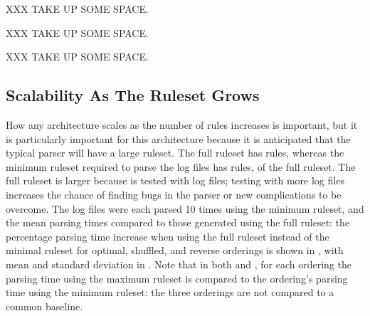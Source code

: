 XXX TAKE UP SOME SPACE\@.

XXX TAKE UP SOME SPACE\@.

XXX TAKE UP SOME SPACE\@.





\FloatBarrier{}

\subsection{Scalability As The Ruleset Grows}

\label{scalability as the number of rules rises}

How any architecture scales as the number of rules increases is important,
but it is particularly important for this architecture because it is
anticipated that the typical parser will have a large ruleset.  The full
\parsername{} ruleset has \numberOFrules{} rules, whereas the minimum
ruleset required to parse the \numberOFlogFILES{} log files has
\numberOFrulesMINIMUM{} rules, \numberOFrulesMINIMUMpercentage{} of the
full ruleset.  The full ruleset is larger because \parsername{} is tested
with \numberOFlogFILESall{} log files; testing with more log files
increases the chance of finding bugs in the parser or new complications to
be overcome.  The \numberOFlogFILES{} log files were each parsed 10 times
using the minimum ruleset, and the mean parsing times compared to those
generated using the full ruleset: the percentage parsing time increase when
using the full ruleset instead of the minimal ruleset for optimal,
shuffled, and reverse orderings is shown in , with mean and standard deviation in .  Note that in both  and
, for each ordering the parsing time
using the maximum ruleset is compared to the ordering's parsing time using
the minimum ruleset: the three orderings are not compared to a common
baseline.


